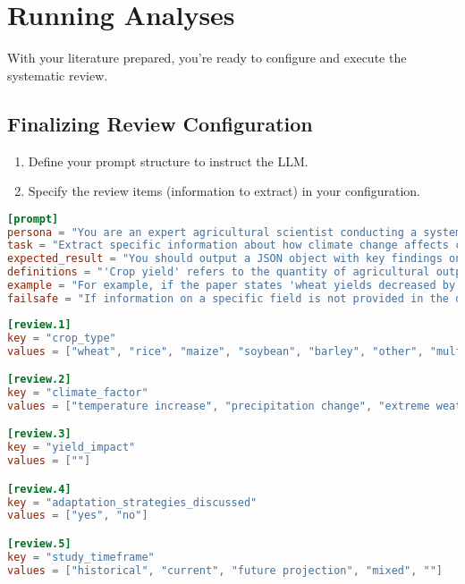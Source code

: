 \section{Running Analyses}

With your literature prepared, you're ready to configure and execute the systematic review.

\subsection{Finalizing Review Configuration}

\begin{enumerate}
    \item Define your prompt structure to instruct the LLM.
    \item Specify the review items (information to extract) in your configuration.
\end{enumerate}

\begin{configbox}
\begin{lstlisting}[language=TOML]
[prompt]
persona = "You are an expert agricultural scientist conducting a systematic review on climate change impacts."
task = "Extract specific information about how climate change affects crop yields from the scientific paper text provided."
expected_result = "You should output a JSON object with key findings on crop types, climate factors, and measured impacts."
definitions = "'Crop yield' refers to the quantity of agricultural output harvested per unit of land area."
example = "For example, if the paper states 'wheat yields decreased by 5.2% per degree Celsius increase', report 'wheat' as crop_type, 'temperature increase' as climate_factor, and '-5.2% per °C' as yield_impact."
failsafe = "If information on a specific field is not provided in the document, respond with an empty string value."
\end{lstlisting}
\end{configbox}

\begin{configbox}
\begin{lstlisting}[language=TOML]
[review.1]
key = "crop_type"
values = ["wheat", "rice", "maize", "soybean", "barley", "other", "multiple", ""]

[review.2]
key = "climate_factor"
values = ["temperature increase", "precipitation change", "extreme weather", "CO2 levels", "multiple factors", "other", ""]

[review.3]
key = "yield_impact"
values = [""]

[review.4]
key = "adaptation_strategies_discussed"
values = ["yes", "no"]

[review.5]
key = "study_timeframe"
values = ["historical", "current", "future projection", "mixed", ""]
\end{lstlisting}
\end{configbox}

